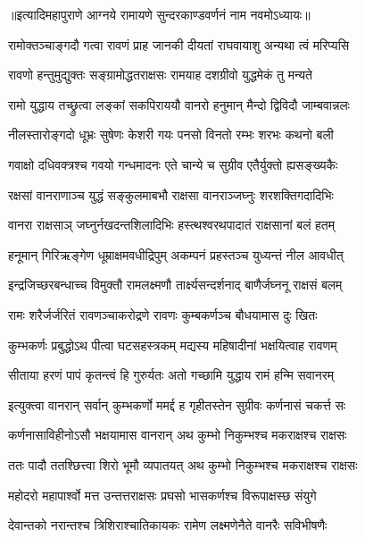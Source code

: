 ॥इत्यादिमहापुराणे आग्नये रामायणे सुन्दरकाण्डवर्णनं नाम नवमोऽध्यायः॥


\twolineshloka
{रामोक्तञ्चाङ्गदौ गत्वा रावणं प्राह जानकी}
{दीयतां राघवायाशु अन्यथा त्वं मरिप्यसि}%

\twolineshloka
{रावणो हन्तुमुद्युक्तः सङ्ग्रामोद्धतराक्षसः}
{रामयाह दशग्रीवो युद्धमेकं तु मन्यते}%

\twolineshloka
{रामो युद्धाय तच्छ्रुत्वा लङ्कां सकपिराययौ}
{वानरो हनुमान् मैन्दो द्विविदौ जाम्बवान्नलः}%

\twolineshloka
{नीलस्तारोङ्गदो धूभ्रः सुषेणः केशरी गयः}
{पनसो विनतो रम्भः शरभः कथनो बली}%

\twolineshloka
{गवाक्षो दधिवक्त्रश्च गवयो गन्धमादनः}
{एते चान्ये च सुग्रीव एतैर्युक्तो ह्यसङ्ख्यकैः}%

\twolineshloka
{रक्षसां वानराणाञ्च युद्धं सङ्कुलमाबभौ}
{राक्षसा वानराञ्जघ्नुः शरशक्तिगदादिभिः}%

\twolineshloka
{वानरा राक्षसाञ् जघ्नुर्नखदन्तशिलादिभिः}
{हस्त्थश्वरथपादातं राक्षसानां बलं हतम्} %

\twolineshloka
{हनूमान् गिरिऋङ्गेण धूम्राक्षमवधीद्रिपुम्}
{अकम्पनं प्रहस्तञ्च युध्यन्तं नील आवधीत्}%

\twolineshloka
{इन्द्रजिच्छरबन्धाच्च विमुक्तौ रामलक्ष्मणौ}
{तार्क्ष्यसन्दर्शनाद् बाणैर्जघ्ननू राक्षसं बलम्}%

\twolineshloka
{रामः शरैर्जर्जरितं रावणञ्चाकरोद्रणे}
{रावणः कुम्बकर्णञ्च बौधयामास दुः खितः}%

\twolineshloka
{कुम्भकर्णः प्रबुद्धोऽथ पीत्वा घटसहस्त्रकम्}
{मद्यस्य महिषादीनां भक्षयित्वाह रावणम्}%

\twolineshloka
{सीताया हरणं पापं कृतन्त्वं हि गुरुर्यतः}
{अतो गच्छामि युद्धाय रामं हन्मि सवानरम्}%

\twolineshloka
{इत्युक्त्वा वानरान् सर्वान् कुम्भकर्णो ममर्द्द ह}
{गृहीतस्तेन सुग्रीवः कर्णनासं चकर्त्त सः}%

\twolineshloka
{कर्णनासाविहीनोऽसौ भक्षयामास वानरान्}
{अथ कुम्भो निकुम्भश्च मकराक्षश्च राक्षसः}%

\twolineshloka
{ततः पादौ ततश्छित्त्वा शिरो भूमौ व्यपातयत् }
{अथ कुम्भो निकुम्भश्च मकराक्षश्च राक्षसः}%

\twolineshloka
{महोदरो महापार्श्वो मत्त उन्तत्तराक्षसः}
{प्रघसो भासकर्णश्च विरूपाक्षस्छ संयुगे}%

\twolineshloka
{देवान्तको नरान्तश्च त्रिशिराश्चातिकायकः}
{रामेण लक्ष्मणेनैते वानरैः सविभीषणैः}%

